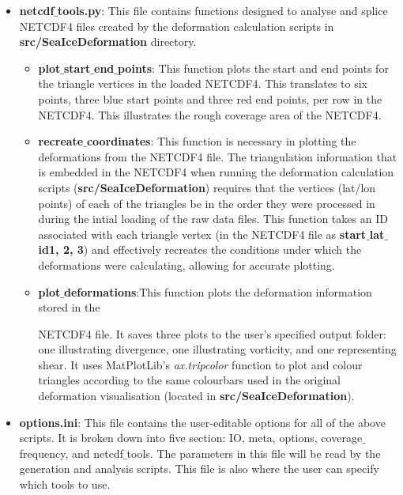 \documentclass[12pt]{article}
\begin{document}
\begin{itemize}
    \item \textbf{netcdf$\_$tools.py}: This file contains functions designed to analyse and splice NETCDF4 files created by the deformation calculation scripts in \textbf{src/SeaIceDeformation} directory.
    
        \begin{itemize}
            \item \textbf{plot$\_$start$\_$end$\_$points}: This function plots the start and end points for the triangle vertices in the loaded NETCDF4. This translates to six points, three blue start points and three red end points, per row in the NETCDF4. This illustrates the rough coverage area of the NETCDF4.
            
            \item \textbf{recreate$\_$coordinates}: This function is necessary in plotting the deformations from the NETCDF4 file. The triangulation information that is embedded in the NETCDF4 when running the deformation calculation scripts (\textbf{src/SeaIceDeformation}) requires that the vertices (lat/lon points) of each of the triangles be in the order they were processed in during the intial loading of the raw data files. This function takes an ID associated with each triangle vertex (in the NETCDF4 file as \textbf{start$\_$lat$\_$id1, 2, 3}) and effectively recreates the conditions under which the deformations were calculating, allowing for accurate plotting.
            
            \item \textbf{plot$\_$deformations}:This function  plots the deformation information stored in the 
            
            
            NETCDF4 file. It saves three plots to the user's specified output folder: one illustrating divergence, one illustrating vorticity, and one representing shear. It uses MatPlotLib's \textit{ax.tripcolor} function to plot and colour triangles according to the same colourbars used in the original deformation visualisation (located in \textbf{src/SeaIceDeformation}).
        
        \end{itemize}

    \item \textbf{options.ini}: This file contains the user-editable options for all of the above scripts. It is broken down into five section: IO, meta, options, coverage$\_$frequency, and netcdf$\_$tools. The parameters in this file will be read by the generation and analysis scripts. This file is also where the user can specify which tools to use.
\end{itemize}
\end{document}

